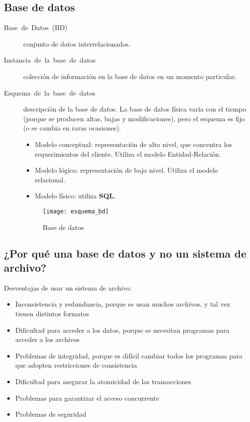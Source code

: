 \documentclass[a4paper, twoside]{article}
\begin{document}
\subsection{Base de datos}
\begin{description}
\item [{Base~de~Datos~(BD)}] conjunto de datos interrelacionados.
\item [{Instancia~de~la~base~de~datos}] colección de información en
la base de datos en un momento particular.
\item [{Esquema~de~la~base~de~datos}] descripción de la base de datos.
La base de datos física varía con el tiempo (porque se producen altas,
bajas y modificaciones), pero el esquema es fijo (o se cambia en raras
ocasiones).

\begin{itemize}
\item Modelo conceptual: representación de alto nivel, que concentra los
requerimientos del cliente. Utiliza el modelo Entidad-Relación.
\item Modelo lógico: representación de bajo nivel. Utiliza el modelo relacional.
\item Modelo físico: utiliza \textbf{SQL}.
\end{itemize}

\begin{figure}[H]
\noindent \begin{centering}
\texttt{[image: esquema\_bd]}
\par\end{centering}

\protect\caption{Base de datos}


\end{figure}


\end{description}

\subsection{¿Por qué una base de datos y no un sistema de archivo?}

Desventajas de usar un sistema de archivo:
\begin{itemize}
\item Inconsistencia y redundancia, porque se usan muchos archivos, y tal
vez tienen distintos formatos
\item Dificultad para acceder a los datos, porque se necesitan programas
para acceder a los archivos
\item Problemas de integridad, porque es difícil cambiar todos los programas
para que adopten restricciones de consistencia
\item Dificultad para asegurar la atomicidad de las transacciones
\item Problemas para garantizar el acceso concurrente
\item Problemas de seguridad
\end{itemize}
\end{document}
